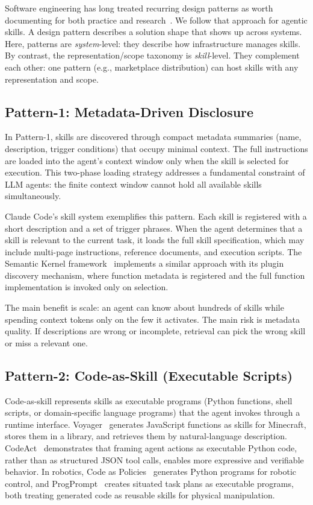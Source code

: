 \documentclass[conference, compsoc]{IEEEtran}
\theoremstyle{plain}
\begin{document}
Software engineering has long treated recurring design patterns as worth documenting for both practice and research~\cite{gamma1994designpatterns}. We follow that approach for agentic skills. A design pattern describes a solution shape that shows up across systems. Here, patterns are \emph{system}-level: they describe how infrastructure manages skills. By contrast, the representation/scope taxonomy is \emph{skill}-level. They complement each other: one pattern (e.g., marketplace distribution) can host skills with any representation and scope.

\subsection{Pattern-1: Metadata-Driven Disclosure}
\label{sec:patterns:metadata}

In Pattern-1, skills are discovered through compact metadata summaries (name, description, trigger conditions) that occupy minimal context. The full instructions are loaded into the agent's context window only when the skill is selected for execution. This two-phase loading strategy addresses a fundamental constraint of LLM agents: the finite context window cannot hold all available skills simultaneously.

Claude Code's skill system exemplifies this pattern. Each skill is registered with a short description and a set of trigger phrases. When the agent determines that a skill is relevant to the current task, it loads the full skill specification, which may include multi-page instructions, reference documents, and execution scripts. The Semantic Kernel framework~\cite{semantickernel2023} implements a similar approach with its plugin discovery mechanism, where function metadata is registered and the full function implementation is invoked only on selection.

The main benefit is scale: an agent can know about hundreds of skills while spending context tokens only on the few it activates. The main risk is metadata quality. If descriptions are wrong or incomplete, retrieval can pick the wrong skill or miss a relevant one.

\subsection{Pattern-2: Code-as-Skill (Executable Scripts)}
\label{sec:patterns:code}

Code-as-skill represents skills as executable programs (Python functions, shell scripts, or domain-specific language programs) that the agent invokes through a runtime interface. Voyager~\cite{wang2023voyager} generates JavaScript functions as skills for Minecraft, stores them in a library, and retrieves them by natural-language description. CodeAct~\cite{wang2024codeact} demonstrates that framing agent actions as executable Python code, rather than as structured JSON tool calls, enables more expressive and verifiable behavior. In robotics, Code as Policies~\cite{liang2023code} generates Python programs for robotic control, and ProgPrompt~\cite{singh2023progprompt} creates situated task plans as executable programs, both treating generated code as reusable skills for physical manipulation.
\end{document}
